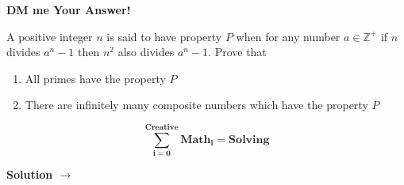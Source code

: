 \documentclass[12pt]{article}
\begin{document}
	










	\begin{center}
		\thispagestyle{empty}

\vspace*{1.5cm}

		{\Huge\textbf{DM me Your Answer!}}
		\vspace*{1cm}
	\end{center}
		
		{\Huge A positive integer $n $ is said to have property $P $ when for any number $a \in\mathbb {Z}^+$ if $n $ divides $a^n-1$ then $n^2$ also divides $a^n-1$. Prove that \begin{enumerate}
\item All primes have the property $P $
\item There are infinitely many composite numbers which have the property $P $
\end{enumerate}}
	\begin{center}	
		
		\vspace{1cm}

{\fontsize{40}{30}\selectfont 
		
		$$\boldsymbol{\sum \limits_{i=0}^{Creative} Math_i = Solving}$$}
		
		\vspace{1cm}
		
		\begin{mybox}\Huge{\begin{center}\textbf{\textcolor{Green4}{Solution $\to$}} \end{center}}\end{mybox}
	\end{center}
\end{document}
